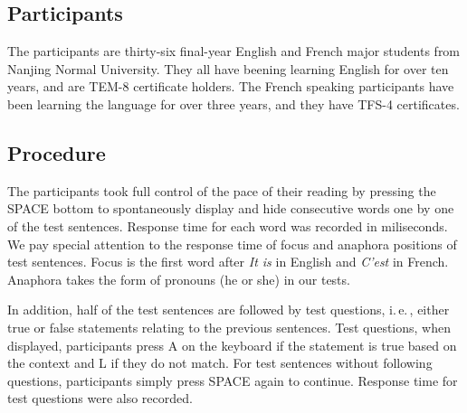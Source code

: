 \subsection{Participants}
The participants are thirty-six final-year English and French major students from Nanjing Normal University. They all have beening learning English for over ten years, and are TEM-8 certificate holders. The French speaking participants have been learning the language for over three years, and they have TFS-4 certificates.

\subsection{Procedure}
The participants took full control of the pace of their reading by pressing the \textsf{SPACE} bottom to spontaneously display and hide consecutive words one by one of the test sentences. Response time for each word was recorded in miliseconds. We pay special attention to the response time of focus and anaphora positions of test sentences. Focus is the first word after \emph{It is} in English and \emph{C'est} in French. Anaphora takes the form of pronouns (he or she) in our tests.

In addition, half of the test sentences are followed by test questions, i.\,e.\,, either true or false statements relating to the previous sentences. Test questions, when displayed, participants press \textsf{A} on the keyboard if the statement is true based on the context and \textsf{L} if they do not match. For test sentences without following questions, participants simply press \textsf{SPACE} again to continue. Response time for test questions were also recorded.

